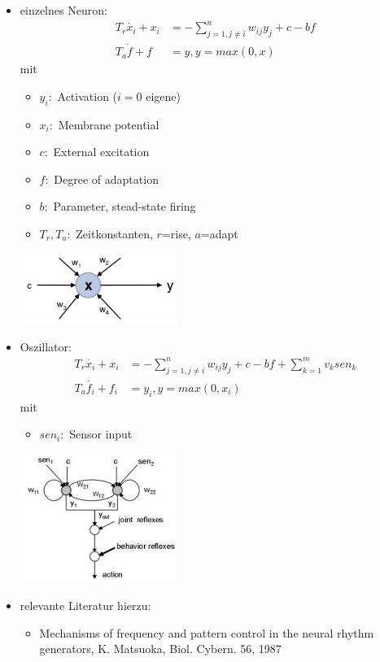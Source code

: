 \begin{itemize}
\item einzelnes Neuron: 
\begin{align*}
T_r\dot{x_i} + x_i &= - \sum\limits_{j = 1, j\neq i}^n w_{ij}y_j + c-bf\\
T_a\dot{f} + f &= y, y = max(0,x)
\end{align*} mit
\begin{itemize}
\item $y_i:$ Activation ($i=0$ eigene)
\item $x_i:$ Membrane potential
\item $c:$ External excitation
\item $f:$ Degree of adaptation
\item $b:$ Parameter, stead-state firing
\item $T_r, T_a:$ Zeitkonstanten, $r$=rise, $a$=adapt
\end{itemize}
\includegraphics[width=0.4\textwidth]{figures/ch05_matsuoka.png}
\item Oszillator:
\begin{align*}
T_r\dot{x_i} + x_i &= - \sum\limits_{j = 1, j\neq i}^n w_{ij}y_j + c-bf + \sum\limits_{k=1}^m v_k sen_k\\
T_a\dot{f_i} + f_i &= y_i, y = max(0,x_i)
\end{align*} mit
\begin{itemize}
\item $sen_i:$ Sensor input
\end{itemize}
\includegraphics[width=0.4\textwidth]{figures/ch05_matHalfCenter.png}
\item relevante Literatur hierzu:
\begin{itemize}
\item \glqq Mechanisms of frequency and pattern control in the neural rhythm generators\grqq , K. Matsuoka, Biol. Cybern. 56, 1987

\end{itemize}
\end{itemize}
